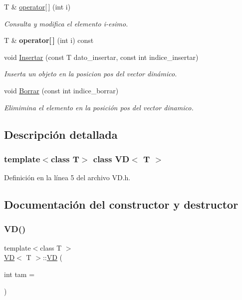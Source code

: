 \begin{DoxyCompactItemize}
T \& \hyperlink{classVD_a7d80240b5791d62b7e27657763afe712}{operator\mbox{[}$\,$\mbox{]}} (int i)
\begin{DoxyCompactList}\small\item\em Consulta y modifica el elemento i-\/esimo. \end{DoxyCompactList}\item 
\mbox{\label{classVD_a4230bcb2043867ee70e02dd128672f6f}} 
T \& {\bfseries operator\mbox{[}$\,$\mbox{]}} (int i) const
\item 
void \hyperlink{classVD_a17d26b0f313f22b49b38ba1c8fd80e73}{Insertar} (const T dato\+\_\+insertar, const int indice\+\_\+insertar)
\begin{DoxyCompactList}\small\item\em Inserta un objeto en la posicion pos del vector dinámico. \end{DoxyCompactList}\item 
void \hyperlink{classVD_a033d6e246f6a49cf66a1cad25b52aa8b}{Borrar} (const int indice\+\_\+borrar)
\begin{DoxyCompactList}\small\item\em Elimimina el elemento en la posición pos del vector dinamico. \end{DoxyCompactList}\end{DoxyCompactItemize}


\subsection{Descripción detallada}
\subsubsection*{template$<$class T$>$\newline
class V\+D$<$ T $>$}



Definición en la línea 5 del archivo V\+D.\+h.



\subsection{Documentación del constructor y destructor}
\mbox{\label{classVD_a1ce73549d14f68caecaa593de3255c30}} 
\subsubsection{\texorpdfstring{V\+D()}{VD()}\hspace{0.1cm}{\footnotesize\ttfamily [1/2]}}
{\footnotesize\ttfamily template$<$class T $>$ \\
\hyperlink{classVD}{VD}$<$ T $>$\+::\hyperlink{classVD}{VD} (\begin{DoxyParamCaption}\item[{int}]{tam = {} }\end{DoxyParamCaption})}



